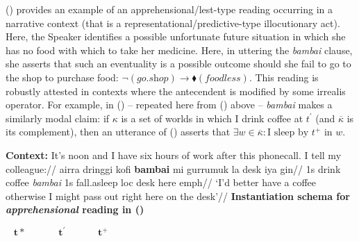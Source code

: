 () provides an example of an apprehensional/{\sc lest}-type reading occurring in a narrative context (that is a representational/predictive-type illocutionary act). Here, the Speaker identifies a possible unfortunate future situation in which she has no food with which to take her medicine. Here, in uttering the \textit{bambai} clause, she asserts that such an eventuality is a possible outcome should she fail to go to the shop to purchase food: $ \neg(\textit{go.shop})\to\blacklozenge(\textit{foodless}) $. This reading is robustly attested in contexts where the antecendent is modified by some irrealis operator. For example, in () -- repeated here from () above -- \textit{bambai} makes a similarly modal claim: if $\kappa$ is a set of worlds in which I drink coffee at $t^\prime$ (and $\overline{\kappa}$ is its complement), then an utterance of () asserts that $\exists w\in\overline{\kappa}:\text{I sleep by }t^+\text{ in }w.$

\pex\a{}\begingl
\glpreamble\textbf{Context:}  It's noon and I have six hours of work after this phonecall. I tell my colleague://
\gla ai\textdblhyphen{}rra dringgi kofi \textbf{bambai} mi gurrumuk la desk iya gin//
\glb 1s drink coffee \textit{bambai} 1s fall.asleep {\sc loc} desk here {\sc emph}//
\glft `I'd better have a coffee otherwise I might pass out right here on the desk'\trailingcitation{[GT~28052016]}//
\endgl\vspace{.5cm}
\a \textup{\textbf{Instantiation schema for \textit{apprehensional} reading in ()}}


$\boldsymbol{\hspace{10pt}t\!*\hspace{40pt}  t^\prime \hspace{40pt}  t^+ }$\vspace{.3cm}

\leavevmode\vadjust{\vspace{-\baselineskip}}\newline{}

